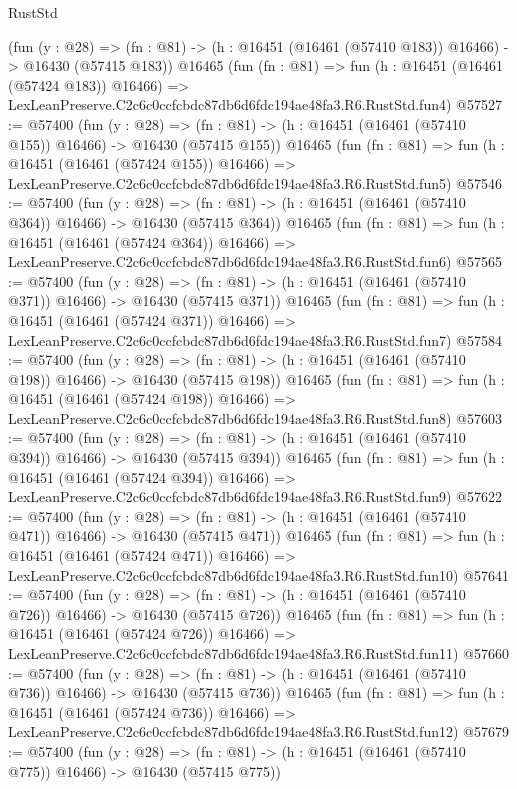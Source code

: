 \begin{lexlean}{RustStd}
\begin{coremodule}
    (fun (y : @28) =>
    (fn : @81) -> (h : @16451 (@16461 (@57410 @183)) @16466) -> @16430 (@57415 @183))
    @16465
    (fun (fn : @81) =>
    fun (h : @16451 (@16461 (@57424 @183)) @16466) =>
    LexLeanPreserve.C2c6c0ccfcbdc87db6d6fdc194ae48fa3.R6.RustStd.fun4)
@57527 := @57400
    (fun (y : @28) =>
    (fn : @81) -> (h : @16451 (@16461 (@57410 @155)) @16466) -> @16430 (@57415 @155))
    @16465
    (fun (fn : @81) =>
    fun (h : @16451 (@16461 (@57424 @155)) @16466) =>
    LexLeanPreserve.C2c6c0ccfcbdc87db6d6fdc194ae48fa3.R6.RustStd.fun5)
@57546 := @57400
    (fun (y : @28) =>
    (fn : @81) -> (h : @16451 (@16461 (@57410 @364)) @16466) -> @16430 (@57415 @364))
    @16465
    (fun (fn : @81) =>
    fun (h : @16451 (@16461 (@57424 @364)) @16466) =>
    LexLeanPreserve.C2c6c0ccfcbdc87db6d6fdc194ae48fa3.R6.RustStd.fun6)
@57565 := @57400
    (fun (y : @28) =>
    (fn : @81) -> (h : @16451 (@16461 (@57410 @371)) @16466) -> @16430 (@57415 @371))
    @16465
    (fun (fn : @81) =>
    fun (h : @16451 (@16461 (@57424 @371)) @16466) =>
    LexLeanPreserve.C2c6c0ccfcbdc87db6d6fdc194ae48fa3.R6.RustStd.fun7)
@57584 := @57400
    (fun (y : @28) =>
    (fn : @81) -> (h : @16451 (@16461 (@57410 @198)) @16466) -> @16430 (@57415 @198))
    @16465
    (fun (fn : @81) =>
    fun (h : @16451 (@16461 (@57424 @198)) @16466) =>
    LexLeanPreserve.C2c6c0ccfcbdc87db6d6fdc194ae48fa3.R6.RustStd.fun8)
@57603 := @57400
    (fun (y : @28) =>
    (fn : @81) -> (h : @16451 (@16461 (@57410 @394)) @16466) -> @16430 (@57415 @394))
    @16465
    (fun (fn : @81) =>
    fun (h : @16451 (@16461 (@57424 @394)) @16466) =>
    LexLeanPreserve.C2c6c0ccfcbdc87db6d6fdc194ae48fa3.R6.RustStd.fun9)
@57622 := @57400
    (fun (y : @28) =>
    (fn : @81) -> (h : @16451 (@16461 (@57410 @471)) @16466) -> @16430 (@57415 @471))
    @16465
    (fun (fn : @81) =>
    fun (h : @16451 (@16461 (@57424 @471)) @16466) =>
    LexLeanPreserve.C2c6c0ccfcbdc87db6d6fdc194ae48fa3.R6.RustStd.fun10)
@57641 := @57400
    (fun (y : @28) =>
    (fn : @81) -> (h : @16451 (@16461 (@57410 @726)) @16466) -> @16430 (@57415 @726))
    @16465
    (fun (fn : @81) =>
    fun (h : @16451 (@16461 (@57424 @726)) @16466) =>
    LexLeanPreserve.C2c6c0ccfcbdc87db6d6fdc194ae48fa3.R6.RustStd.fun11)
@57660 := @57400
    (fun (y : @28) =>
    (fn : @81) -> (h : @16451 (@16461 (@57410 @736)) @16466) -> @16430 (@57415 @736))
    @16465
    (fun (fn : @81) =>
    fun (h : @16451 (@16461 (@57424 @736)) @16466) =>
    LexLeanPreserve.C2c6c0ccfcbdc87db6d6fdc194ae48fa3.R6.RustStd.fun12)
@57679 := @57400
    (fun (y : @28) =>
    (fn : @81) -> (h : @16451 (@16461 (@57410 @775)) @16466) -> @16430 (@57415 @775))

\end{coremodule}
\end{lexlean}
